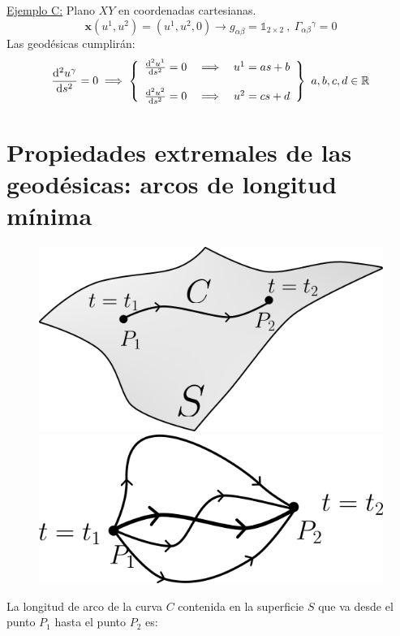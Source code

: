 \begin{mybox}
    \underline{Ejemplo C:} Plano $XY$ en coordenadas cartesianas.
    $$
    \mathbf{x}(u^1,u^2)=(u^1,u^2,0) \longrightarrow g_{\alpha \beta }=\mathbb{1}_{2\times 2} \ , \ \Gamma _{\alpha \beta }{}^\gamma =0
    $$
    Las geodésicas cumplirán:
    $$
    \dv[2]{u^\gamma }{s}=0\implies \left \{ \begin{array}{ccc}
         \dv[2]{u^1}{s}=0&\implies&u^1=as+b   \\\\
         \dv[2]{u^2}{s}=0&\implies&u^2=cs+d 
    \end{array} \right \} \ a,b,c,d \in \mathbb{R}
    $$
\end{mybox}
\section{Propiedades extremales de las geodésicas: arcos de longitud mínima}
\begin{figure}
    \centering
    \includegraphics[scale=.4]{FOTOS/min_arco1.png}
    \includegraphics[scale=.35]{FOTOS/min_arco2.png}
\end{figure}
La longitud de arco de la curva $C$ contenida en la superficie $S$ que va desde el punto $P_1$ hasta el punto $P_2$ es:
